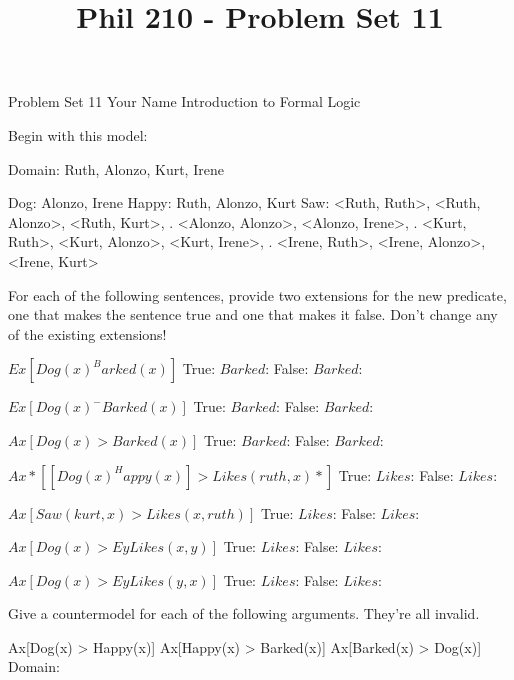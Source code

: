 
\title{Phil 210 - Problem Set 11}

\heading
Problem Set 11
Your Name
Introduction to Formal Logic
\endheading

Begin with this model:

\answer
        \firstordermodel 
        Domain: Ruth, Alonzo, Kurt, Irene

        Dog:    Alonzo, Irene
        Happy:  Ruth, Alonzo, Kurt
        Saw:    <Ruth, Ruth>, <Ruth, Alonzo>, <Ruth, Kurt>,
           .    <Alonzo, Alonzo>, <Alonzo, Irene>,
           .    <Kurt, Ruth>, <Kurt, Alonzo>, <Kurt, Irene>,
           .    <Irene, Ruth>, <Irene, Alonzo>, <Irene, Kurt>
        \endfirstordermodel
\endanswer\bigskip

For each of the following sentences, provide two extensions for the new predicate, one that makes the sentence true and one that makes it false. Don't change any of the existing extensions!

\problems
{}
$ Ex[Dog(x) ^ Barked(x)] $
        \answer
        True: $Barked$: 
        False: $Barked$: 
        \endanswer

$ Ex[Dog(x) ^ -Barked(x)] $
        \answer
        True: $Barked$: 
        False: $Barked$: 
        \endanswer

$ Ax[Dog(x) > Barked(x)] $
        \answer
        True: $Barked$: 
        False: $Barked$: 
        \endanswer

$ Ax*[[Dog(x) ^ Happy(x)] > Likes(ruth,x)*] $
        \answer
        True: $Likes$: 
        False: $Likes$: 
        \endanswer

$ Ax[Saw(kurt,x) > Likes(x,ruth)] $
        \answer
        True: $Likes$: 
        False: $Likes$: 
        \endanswer

$ Ax[Dog(x) > Ey Likes(x,y)] $
        \answer
        True: $Likes$: 
        False: $Likes$: 
        \endanswer

$ Ax[Dog(x) > Ey Likes(y,x)] $
        \answer
        True: $Likes$: 
        False: $Likes$: 
        \endanswer

\endproblems

Give a countermodel for each of the following arguments. They're all invalid.

\problems
{}
\argument
 Ax[Dog(x) > Happy(x)]
 Ax[Happy(x) > Barked(x)]
\argumentline
 Ax[Barked(x) > Dog(x)]
\endargument
        \answer
        \firstordermodel
        Domain: 

